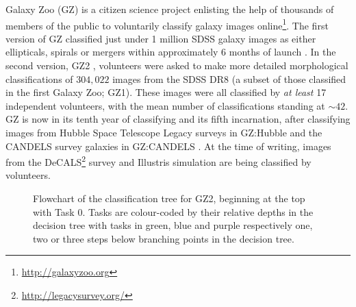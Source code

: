 Galaxy Zoo (GZ) is a citizen science project enlisting the help of thousands of members of the public to voluntarily classify galaxy images online\footnote{\url{http://galaxyzoo.org}}. The first version of GZ classified just under 1 million SDSS galaxy images as either ellipticals, spirals or mergers within approximately 6 months of launch \citep{lintott08, Lintott11}. In the second version, GZ2 \citep{GZ2}, volunteers were asked to make more detailed morphological classifications of $304, 022$ images from the SDSS DR8 (a subset of those classified in the first Galaxy Zoo; GZ1). These images were all classified by \emph{at least} 17 independent volunteers, with the mean number of classifications standing at $\sim42$. GZ is now in its tenth year of classifying and its fifth incarnation, after classifying images from Hubble Space Telescope Legacy surveys in GZ:Hubble \citep{willett16} and the CANDELS survey galaxies in GZ:CANDELS \citep{simmons16}. At the time of writing, images from the DeCALS\footnote{\url{http://legacysurvey.org/}} survey and Illustris simulation \citep{vogelsberger14, genel14} are being classified by volunteers. 

\begin{figure}
\caption[GZ2 classification decision tree]{Flowchart of the classification tree for GZ2, beginning at the top with Task 0. Tasks are colour-coded by their relative depths in the decision tree with tasks in green, blue and purple respectively one, two or three steps below branching points in the decision tree.}
\label{fig:gztree}
\end{figure}

